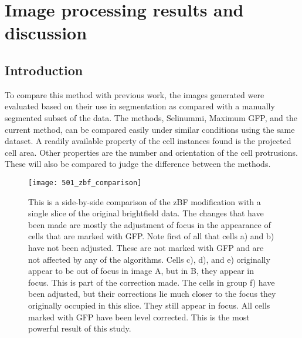 
\chapter{Image processing results and discussion}

\ifpdf
    \graphicspath{{Chapter5/Figs/Raster/}{Chapter5/Figs/PDF/}{Chapter5/Figs/}}
\else
    \graphicspath{{Chapter5/Figs/Vector/}{Chapter5/Figs/}}
\fi

\section{Introduction}

To compare this method with previous work, the images generated were evaluated based on their use in segmentation as compared with a manually segmented subset of the data. The methods, Selinummi, Maximum GFP, and the current method, can be compared easily under similar conditions using the same dataset. A readily available property of the cell instances found is the projected cell area. Other properties are the number and orientation of the cell protrusions. These will also be compared to judge the difference between the methods.

\begin{figure}[h!]
 \centering
 \texttt{[image: 501\_zbf\_comparison]}
 \caption[zBF comparison with brightfield]{
 	This is a side-by-side comparison of the zBF modification with a single slice of the original brightfield data. The changes that have been made are mostly the adjustment of focus in the appearance of cells that are marked with GFP. Note first of all that cells a) and b) have not been adjusted. These are not marked with GFP and are not affected by any of the algorithms. Cells c), d), and e) originally appear to be out of focus in image A, but in B, they appear in focus. This is part of the correction made. The cells in group f) have been adjusted, but their corrections lie much closer to the focus they originally occupied in this slice. They still appear in focus. All cells marked with GFP have been level corrected. This is the most powerful result of this study.
 }
 \label{fig:zbfcomparison}
\end{figure}


